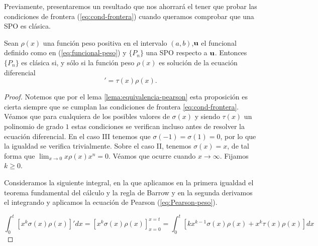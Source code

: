 Previamente, presentaremos un resultado que nos ahorrará el tener que probar las condiciones de frontera (\ref{eq:cond-frontera}) cuando queramos comprobar que una SPO es clásica.

\begin{proposicion}
    Sean $\rho(x)$ una función peso positiva en el intervalo $(a,b)$,$\mathbf{u}$ el funcional definido como en (\ref{eq:funcional-peso}) y $\{P_n\}$ una SPO respecto a $\mathbf{u}$. Entonces $\{P_n\}$ es clásica si, y sólo si la función peso $\rho(x)$ es solución de la ecuación diferencial
    \begin{equation*}
        [\sigma(x)\rho(x)]'=\tau(x)\rho(x).
    \end{equation*}
\end{proposicion}
\begin{proof}
    Notemos que por el lema \ref{lema:equivalencia-pearson} esta proposición es cierta siempre que se cumplan las condiciones de frontera \ref{eq:cond-frontera}. Véamos que para cualquiera de los posibles valores de $\sigma(x)$ y siendo $\tau(x)$ un polinomio de grado $1$ estas condiciones se verifican incluso antes de resolver la ecuación diferencial. En el caso III tenemos que $\sigma(-1)=\sigma(1)=0$, por lo que la igualdad se verifica trivialmente.
    Sobre el caso II, tenemos $\sigma(x)=x$, de tal forma que $\displaystyle\lim_{x\rightarrow 0} x\rho(x)x^n = 0$. Véamos que ocurre cuando $x\rightarrow\infty$. Fijamos $k\geq 0$. 

    Consideramos la siguiente integral, en la que aplicamos en la primera igualdad el teorema fundamental del cálculo y la regla de Barrow y en la segunda derivamos el integrando y aplicamos la ecuación de Pearson (\ref{eq:Pearson-peso}).
    
    \begin{equation*}
            \int_0^t [x^k\sigma(x)\rho(x)]'dx = \left[x^k\sigma(x)\rho(x)\right]_{x=0}^{x=t} = \int_0^t[kx^{k-1}\sigma(x)\rho(x)+x^k\tau(x)\rho(x)]dx
    \end{equation*}


\end{proof}
